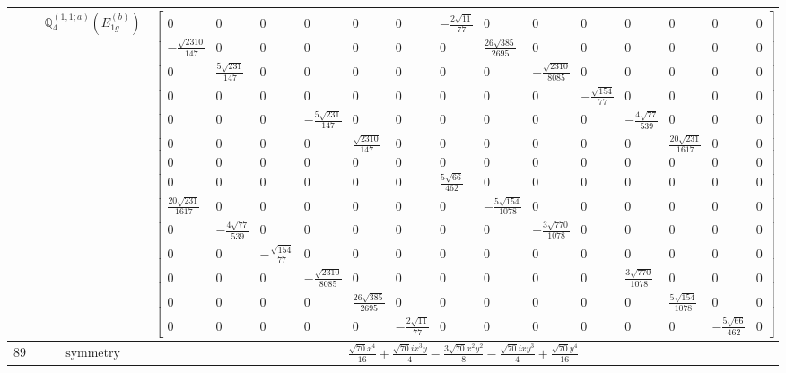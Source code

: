 \documentclass[fleqn,8pt,landscape]{jsarticle}
\begin{document}
\begin{longtable}{ccc}
$  $ & $ \mathbb{Q}_{4}^{(1,1;a)}(E_{1g}^{(b)}) $ & $ \begin{bmatrix} 0 & 0 & 0 & 0 & 0 & 0 & - \frac{2 \sqrt{11}}{77} & 0 & 0 & 0 & 0 & 0 & 0 & 0 \\ - \frac{\sqrt{2310}}{147} & 0 & 0 & 0 & 0 & 0 & 0 & \frac{26 \sqrt{385}}{2695} & 0 & 0 & 0 & 0 & 0 & 0 \\ 0 & \frac{5 \sqrt{231}}{147} & 0 & 0 & 0 & 0 & 0 & 0 & - \frac{\sqrt{2310}}{8085} & 0 & 0 & 0 & 0 & 0 \\ 0 & 0 & 0 & 0 & 0 & 0 & 0 & 0 & 0 & - \frac{\sqrt{154}}{77} & 0 & 0 & 0 & 0 \\ 0 & 0 & 0 & - \frac{5 \sqrt{231}}{147} & 0 & 0 & 0 & 0 & 0 & 0 & - \frac{4 \sqrt{77}}{539} & 0 & 0 & 0 \\ 0 & 0 & 0 & 0 & \frac{\sqrt{2310}}{147} & 0 & 0 & 0 & 0 & 0 & 0 & \frac{20 \sqrt{231}}{1617} & 0 & 0 \\ 0 & 0 & 0 & 0 & 0 & 0 & 0 & 0 & 0 & 0 & 0 & 0 & 0 & 0 \\ 0 & 0 & 0 & 0 & 0 & 0 & \frac{5 \sqrt{66}}{462} & 0 & 0 & 0 & 0 & 0 & 0 & 0 \\ \frac{20 \sqrt{231}}{1617} & 0 & 0 & 0 & 0 & 0 & 0 & - \frac{5 \sqrt{154}}{1078} & 0 & 0 & 0 & 0 & 0 & 0 \\ 0 & - \frac{4 \sqrt{77}}{539} & 0 & 0 & 0 & 0 & 0 & 0 & - \frac{3 \sqrt{770}}{1078} & 0 & 0 & 0 & 0 & 0 \\ 0 & 0 & - \frac{\sqrt{154}}{77} & 0 & 0 & 0 & 0 & 0 & 0 & 0 & 0 & 0 & 0 & 0 \\ 0 & 0 & 0 & - \frac{\sqrt{2310}}{8085} & 0 & 0 & 0 & 0 & 0 & 0 & \frac{3 \sqrt{770}}{1078} & 0 & 0 & 0 \\ 0 & 0 & 0 & 0 & \frac{26 \sqrt{385}}{2695} & 0 & 0 & 0 & 0 & 0 & 0 & \frac{5 \sqrt{154}}{1078} & 0 & 0 \\ 0 & 0 & 0 & 0 & 0 & - \frac{2 \sqrt{11}}{77} & 0 & 0 & 0 & 0 & 0 & 0 & - \frac{5 \sqrt{66}}{462} & 0 \end{bmatrix} $ \\ \hline
$ 895 $ & $ \text{symmetry} $ & $ \frac{\sqrt{70} x^{4}}{16} + \frac{\sqrt{70} i x^{3} y}{4} - \frac{3 \sqrt{70} x^{2} y^{2}}{8} - \frac{\sqrt{70} i x y^{3}}{4} + \frac{\sqrt{70} y^{4}}{16} $ \\

\end{longtable}
\end{document}
